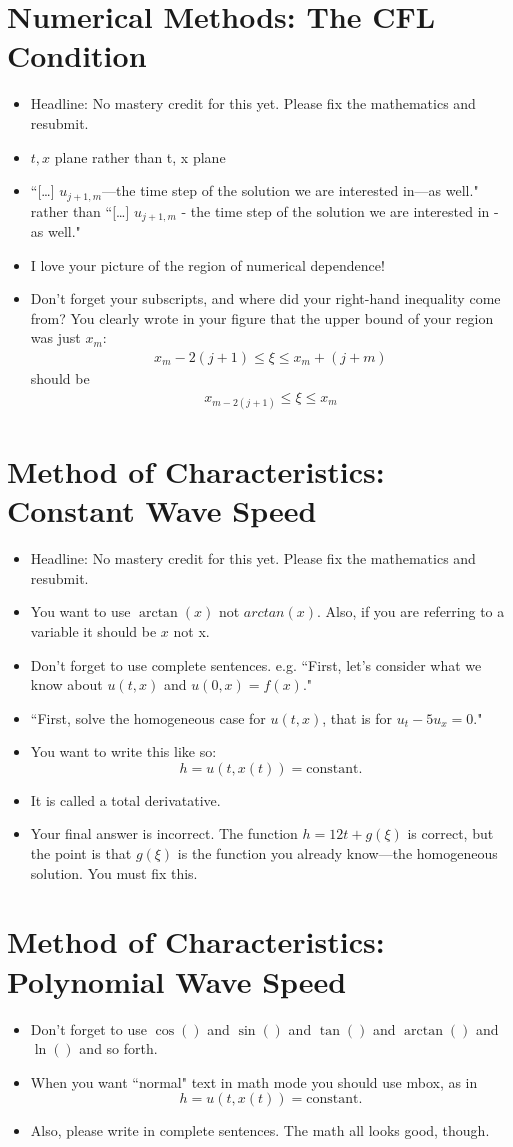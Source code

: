 \documentclass{article}
\newcommand{\bea}{\begin{eqnarray*}}
\newcommand{\eea}{\end{eqnarray*}}
\begin{document}
\section{Numerical Methods: The CFL Condition}
\begin{itemize}
\item Headline: No mastery credit for this yet. Please fix the mathematics and resubmit.
\item $t, x$ plane rather than t, x plane
\item ``[\ldots] $u_{j+1,m}$---the time step of the solution we are interested in---as well." rather than ``[\ldots] $u_{j+1,m}$ - the time step of the solution we are interested in - as well."
\item I love your picture of the region of numerical dependence!
\item Don't forget your subscripts, and where did your right-hand inequality come from? You clearly wrote in your figure that the upper bound of your region was just $x_m$: \bea
 x_{m}-2(j+1) \leq \xi \leq  x_{m}+(j+m)
\eea should be \bea
 x_{m-2(j+1)} \leq \xi \leq  x_{m}
\eea
\end{itemize}

\section{Method of Characteristics: Constant Wave Speed}
\begin{itemize}
\item Headline: No mastery credit for this yet. Please fix the mathematics and resubmit.
\item You want to use $\arctan(x)$ not $arctan(x)$. Also, if you are referring to a variable it should be $x$ not x.
\item Don't forget to use complete sentences. e.g. ``First, let's consider what we know about $u(t,x)$ and $u(0,x)=f(x)$."
\item ``First, solve the homogeneous case for $u(t,x)$, that is for $u_t-5u_x=0$."
\item You want to write this like so: \[h = u(t,x(t)) = \mbox{constant}. \]
\item It is called a total derivatative.
\item Your final answer is incorrect. The function $h=12t+g(\xi)$ is correct, but the point is that $g(\xi)$ is the function you already know---the homogeneous solution. You must fix this.
\end{itemize}

\section{Method of Characteristics: Polynomial Wave Speed}
\begin{itemize}
\item Don't forget to use $\cos()$ and $\sin()$ and $\tan()$ and $\arctan()$ and $\ln()$ and so forth.
\item When you want ``normal" text in math mode you should use mbox, as in \[h = u(t,x(t)) = \mbox{constant}. \]
\item Also, please write in complete sentences. The math all looks good, though.
\end{itemize}
\end{document}
